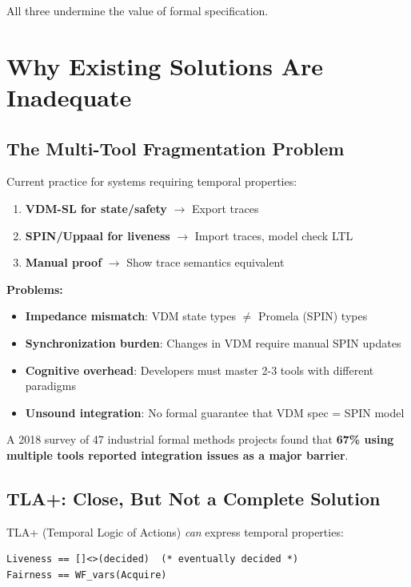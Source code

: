 \documentclass[11pt]{article}
\begin{document}
All three undermine the value of formal specification.

\section{Why Existing Solutions Are Inadequate}

\subsection{The Multi-Tool Fragmentation Problem}

Current practice for systems requiring temporal properties:

\begin{enumerate}
\item \textbf{VDM-SL for state/safety} $\rightarrow$ Export traces
\item \textbf{SPIN/Uppaal for liveness} $\rightarrow$ Import traces, model check LTL
\item \textbf{Manual proof} $\rightarrow$ Show trace semantics equivalent
\end{enumerate}

\textbf{Problems:}
\begin{itemize}
\item \textbf{Impedance mismatch}: VDM state types $\neq$ Promela (SPIN) types
\item \textbf{Synchronization burden}: Changes in VDM require manual SPIN updates
\item \textbf{Cognitive overhead}: Developers must master 2-3 tools with different paradigms
\item \textbf{Unsound integration}: No formal guarantee that VDM spec = SPIN model
\end{itemize}

A 2018 survey of 47 industrial formal methods projects \cite{garavel2018} found that \textbf{67\% using multiple tools reported integration issues as a major barrier}.

\subsection{TLA+: Close, But Not a Complete Solution}

TLA+ (Temporal Logic of Actions) \cite{lamport2002} \textit{can} express temporal properties:

\begin{verbatim}
Liveness == []<>(decided)  (* eventually decided *)
Fairness == WF_vars(Acquire)
\end{verbatim}
\end{document}
